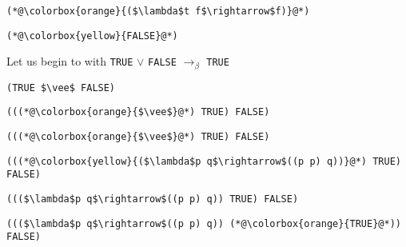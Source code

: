 \documentclass{beamer}
\begin{document}
\begin{frame}[fragile]{\CurrentSection}
\lstset{basicstyle=\ttfamily\small}\lstset{numbers=none}\lstset{language=ML}\begin{lstlisting}
(*@\colorbox{orange}{($\lambda$t f$\rightarrow$f)}@*)
\end{lstlisting}
\pause\lstset{language=ML}\begin{lstlisting}
(*@\colorbox{yellow}{FALSE}@*)
\end{lstlisting}

\end{frame}

\begin{frame}[fragile]{\CurrentSection}
\begin{block}{\CurrentSubSection}
Let us begin to with \texttt{TRUE} $\vee$ \texttt{FALSE} $\rightarrow_\beta$ \texttt{TRUE}
\end{block}


\end{frame}

\begin{frame}[fragile]{\CurrentSection}
\lstset{basicstyle=\ttfamily\small}\lstset{numbers=none}\lstset{language=ML}\begin{lstlisting}
(TRUE $\vee$ FALSE)
\end{lstlisting}
\pause\lstset{language=ML}\begin{lstlisting}
(((*@\colorbox{orange}{$\vee$}@*) TRUE) FALSE)
\end{lstlisting}

\end{frame}

\begin{frame}[fragile]{\CurrentSection}
\lstset{basicstyle=\ttfamily\small}\lstset{numbers=none}\lstset{language=ML}\begin{lstlisting}
(((*@\colorbox{orange}{$\vee$}@*) TRUE) FALSE)
\end{lstlisting}
\pause\lstset{language=ML}\begin{lstlisting}
(((*@\colorbox{yellow}{($\lambda$p q$\rightarrow$((p p) q))}@*) TRUE) FALSE)
\end{lstlisting}

\end{frame}

\begin{frame}[fragile]{\CurrentSection}
\lstset{basicstyle=\ttfamily\small}\lstset{numbers=none}\lstset{language=ML}\begin{lstlisting}
((($\lambda$p q$\rightarrow$((p p) q)) TRUE) FALSE)
\end{lstlisting}
\pause\lstset{language=ML}\begin{lstlisting}
((($\lambda$p q$\rightarrow$((p p) q)) (*@\colorbox{orange}{TRUE}@*)) FALSE)
\end{lstlisting}

\end{frame}
\end{document}
